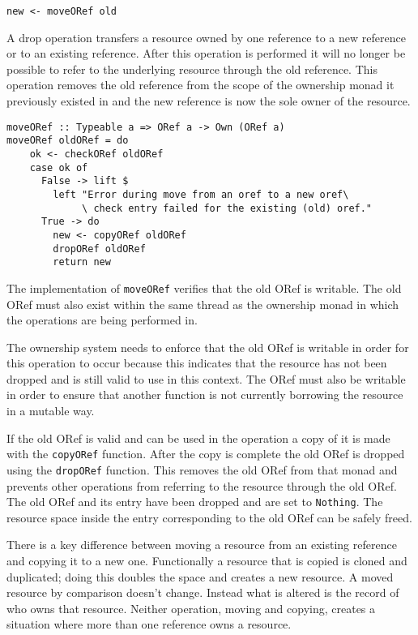 \documentclass[onehalf,11pt]{beavtex}
\begin{document}
\begin{verbatim}
new <- moveORef old
\end{verbatim}

A drop operation transfers a resource owned by one reference to a new reference or
to an existing reference.
After this operation is performed it will no longer be possible to refer to the
underlying resource through the old reference. This
operation removes the old reference from the scope of the ownership monad it
previously existed in and the new reference is now the sole owner of the
resource.

\begin{verbatim}
moveORef :: Typeable a => ORef a -> Own (ORef a)
moveORef oldORef = do
    ok <- checkORef oldORef
    case ok of
      False -> lift $
        left "Error during move from an oref to a new oref\
             \ check entry failed for the existing (old) oref."
      True -> do
        new <- copyORef oldORef
        dropORef oldORef
        return new
\end{verbatim}

The implementation of \texttt{moveORef} verifies that the old ORef is writable.
The old ORef must also exist within the same thread as the ownership monad in
which the operations are being performed in.

The ownership system needs to enforce that the old ORef is
writable in order for this operation to occur because this indicates that the
resource has not been dropped and is still valid to use in this context.
The ORef must also be writable in order to ensure that another function
is not currently borrowing the resource in a mutable way.

If the old ORef is valid and can be used in the operation a copy of it is made
with the \texttt{copyORef} function.  After the copy is complete the old ORef
is dropped using the \texttt{dropORef} function. This removes the old ORef from
that monad and prevents other operations from referring to the resource through
the old ORef.
The old ORef and its entry have been dropped and are set to \texttt{Nothing}.
The resource space inside the entry corresponding to the old ORef can be safely
freed.

There is a key difference between moving a resource from an existing reference
and copying it to a new one.  Functionally a resource that is copied is cloned
and duplicated; doing this doubles the space and creates a new resource.
A moved resource by comparison doesn't change.  Instead what is altered is the
record of who owns that resource.  Neither operation, moving and copying,
creates a situation where more than one reference owns a resource.
\end{document}
